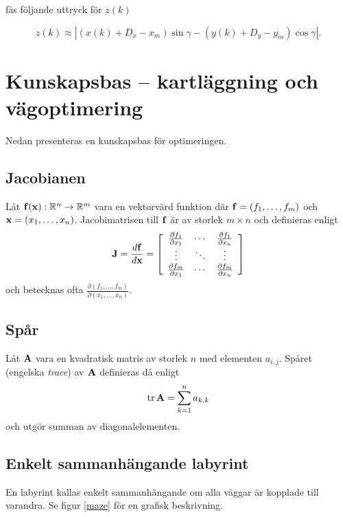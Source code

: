 \documentclass[11pt]{article}
\newcommand{\bfr}[1]{\textbf{\textrm{{#1}}}}
\begin{document}
\begin{flushleft}
fås följande uttryck för $z(k)$

\begin{equation}
	z(k) \approx |(x(k) + D_x - x_m) \sin \gamma - (y(k) + D_y - y_m) \cos \gamma |.
\end{equation}

\section{Kunskapsbas -- kartläggning och vägoptimering}
Nedan presenteras en kunskapsbas för optimeringen.
\subsection{Jacobianen}
Låt $\bfr{f}(\bfr{x}):\mathbb{R}^{n}\rightarrow\mathbb{R}^{m}$ vara en vektorvärd funktion där $\bfr{f}=\left(f_1,\ldots,f_m\right)$ och $\bfr{x}=\left(x_1,\ldots,x_n\right)$. Jacobimatrisen till $\bfr{f}$ är av storlek $m\times n$ och definieras enligt
\begin{equation*}
	\bfr{J} = \frac{d\bfr{f}}{d\bfr{x}} = \left[ \begin{array}{ccc}
		\frac{\partial f_1}{\partial x_1} & \cdots & \frac{\partial f_1}{\partial x_n} \\
		\vdots & \ddots & \vdots \\
		\frac{\partial f_m}{\partial x_1} & \cdots & \frac{\partial f_m}{\partial x_n}
	\end{array} \right]
\end{equation*}
och betecknas ofta $\frac{\partial \left(f_1,\ldots,f_m\right)}{\partial \left(x_1,\ldots,x_n \right)}$.

\subsection{Spår}
Låt $\bfr{A}$ vara en kvadratisk matris av storlek $n$ med elementen $a_{i,j}$. Spåret (engelska \emph{trace}) av $\bfr{A}$ definieras då enligt
\begin{equation*}
	\mathrm{tr}\,\bfr{A} = \sum_{k=1}^{n} a_{k,k}
\end{equation*}
och utgör summan av diagonalelementen.

\subsection{Enkelt sammanhängande labyrint}
En labyrint kallas enkelt sammanhängande om alla väggar är kopplade till varandra. Se figur \ref{maze} för en grafisk beskrivning.


\end{flushleft}
\end{document}
